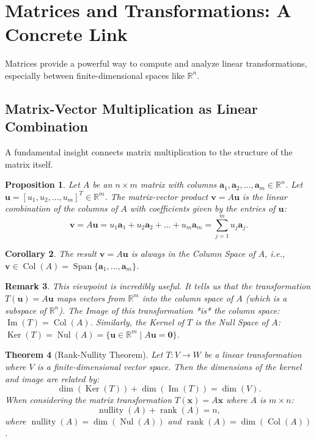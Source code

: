 \documentclass[11pt, a4paper]{article}
\theoremstyle{mytheoremstyle}
\newtheorem{theorem}{Theorem}[section]
\newtheorem{proposition}[theorem]{Proposition}
\newtheorem{corollary}[theorem]{Corollary}
\theoremstyle{mydefstyle}
\newtheorem{remark}[theorem]{Remark}
\newcommand{\R}{\mathbb{R}}      %
\newcommand{\vb}{\mathbf{v}}     %
\newcommand{\ub}{\mathbf{u}}     %
\newcommand{\xb}{\mathbf{x}}     %
\newcommand{\zerob}{\mathbf{0}}  %
\DeclareMathOperator{\Ker}{Ker}  %
\DeclareMathOperator{\Img}{Im}   %
\DeclareMathOperator{\Span}{Span}%
\DeclareMathOperator{\rank}{rank}%
\DeclareMathOperator{\nullity}{nullity} %
\begin{document}
\section{Matrices and Transformations: A Concrete Link}

Matrices provide a powerful way to compute and analyze linear transformations, especially between finite-dimensional spaces like $\R^n$.

\subsection{Matrix-Vector Multiplication as Linear Combination}

A fundamental insight connects matrix multiplication to the structure of the matrix itself.

\begin{proposition}
Let $A$ be an $n \times m$ matrix with columns $\mathbf{a}_1, \mathbf{a}_2, \dots, \mathbf{a}_m \in \R^n$. Let $\ub = [u_1, u_2, \dots, u_m]^T \in \R^m$. The matrix-vector product $\vb = A\ub$ is the linear combination of the columns of $A$ with coefficients given by the entries of $\ub$:
\[ \vb = A\ub = u_1 \mathbf{a}_1 + u_2 \mathbf{a}_2 + \dots + u_m \mathbf{a}_m = \sum_{j=1}^m u_j \mathbf{a}_j. \]
\end{proposition}

\begin{corollary}
The result $\vb = A\ub$ is always in the Column Space of $A$, i.e., $\vb \in \operatorname{Col}(A) = \Span\{\mathbf{a}_1, \dots, \mathbf{a}_m\}$.
\end{corollary}

\begin{remark}
This viewpoint is incredibly useful. It tells us that the transformation $T(\ub) = A\ub$ maps vectors from $\R^m$ into the column space of $A$ (which is a subspace of $\R^n$). The Image of this transformation *is* the column space: $\Img(T) = \operatorname{Col}(A)$. Similarly, the Kernel of $T$ is the Null Space of $A$: $\Ker(T) = \operatorname{Nul}(A) = \{\ub \in \R^m \mid A\ub = \zerob\}$.
\end{remark}

\begin{theorem}[Rank-Nullity Theorem]
Let $T: V \to W$ be a linear transformation where $V$ is a finite-dimensional vector space. Then the dimensions of the kernel and image are related by:
\[ \dim(\Ker(T)) + \dim(\Img(T)) = \dim(V). \]
When considering the matrix transformation $T(\xb) = A\xb$ where $A$ is $m \times n$:
\[ \nullity(A) + \rank(A) = n, \]
where $\nullity(A) = \dim(\operatorname{Nul}(A))$ and $\rank(A) = \dim(\operatorname{Col}(A))$.
\end{theorem}
\end{document}
